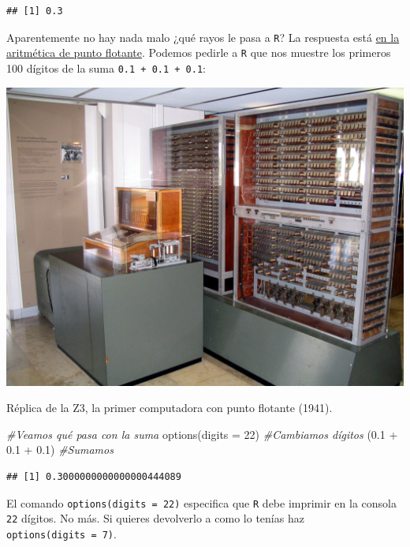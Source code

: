 \documentclass[]{tufte-book}
\newenvironment{Shaded}{}{}
\newcommand{\AttributeTok}[1]{\textcolor[rgb]{0.49,0.56,0.16}{#1}}
\newcommand{\CommentTok}[1]{\textcolor[rgb]{0.38,0.63,0.69}{\textit{#1}}}
\newcommand{\DecValTok}[1]{\textcolor[rgb]{0.25,0.63,0.44}{#1}}
\newcommand{\FloatTok}[1]{\textcolor[rgb]{0.25,0.63,0.44}{#1}}
\newcommand{\FunctionTok}[1]{\textcolor[rgb]{0.02,0.16,0.49}{#1}}
\newcommand{\NormalTok}[1]{#1}
\newcommand{\SpecialCharTok}[1]{\textcolor[rgb]{0.25,0.44,0.63}{#1}}
\begin{document}
\begin{verbatim}
## [1] 0.3
\end{verbatim}

Aparentemente no hay nada malo ¿qué rayos le pasa a \texttt{R}? La
respuesta está \href{https://www.youtube.com/watch?v=PZRI1IfStY0}{en la
aritmética de punto flotante}. Podemos pedirle a \texttt{R} que nos
muestre los primeros 100 dígitos de la suma
\texttt{0.1\ +\ 0.1\ +\ 0.1}:

\begin{marginfigure}
\includegraphics[width=22.22in]{images/Z3_Deutsches_Museum} \caption[Réplica de la Z3, la primer computadora con punto flotante (1941)]{Réplica de la Z3, la primer computadora con punto flotante (1941).}\label{fig:unnamed-chunk-61}
\end{marginfigure}

\begin{Shaded}
\begin{Highlighting}[]
\CommentTok{\#Veamos qué pasa con la suma}
\FunctionTok{options}\NormalTok{(}\AttributeTok{digits =} \DecValTok{22}\NormalTok{) }\CommentTok{\#Cambiamos dígitos}
\NormalTok{(}\FloatTok{0.1} \SpecialCharTok{+} \FloatTok{0.1} \SpecialCharTok{+} \FloatTok{0.1}\NormalTok{)    }\CommentTok{\#Sumamos}
\end{Highlighting}
\end{Shaded}

\begin{verbatim}
## [1] 0.3000000000000000444089
\end{verbatim}

\begin{marginfigure}
El comando \texttt{options(digits\ =\ 22)} especifica que \texttt{R}
debe imprimir en la consola \texttt{22} dígitos. No más. Si quieres
devolverlo a como lo tenías haz \texttt{options(digits\ =\ 7)}.
\end{marginfigure}
\end{document}
